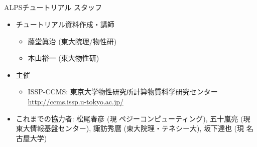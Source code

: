 \subsection*{\redb\whiteb\greenb}
\begin{frame}[t,fragile]{ALPSチュートリアル スタッフ}
  \begin{itemize}
    \setlength{\itemsep}{1em}
  \item チュートリアル資料作成・講師
    \begin{itemize}
    \item 藤堂眞治 (東大院理/物性研)
    \item 本山裕一 (東大物性研)
    \end{itemize}
  \item 主催
    \begin{itemize}
    \item ISSP-CCMS: 東京大学物性研究所計算物質科学研究センター \url{http://ccms.issp.u-tokyo.ac.jp/} \\[2em]
    \end{itemize}
  \item これまでの協力者: 松尾春彦 (現 ペジーコンピューティング), 五十嵐亮 (現 東大情報基盤センター), 諏訪秀麿 (東大院理・テネシー大), 坂下達也 (現 名古屋大学)
  \end{itemize}
\end{frame}

